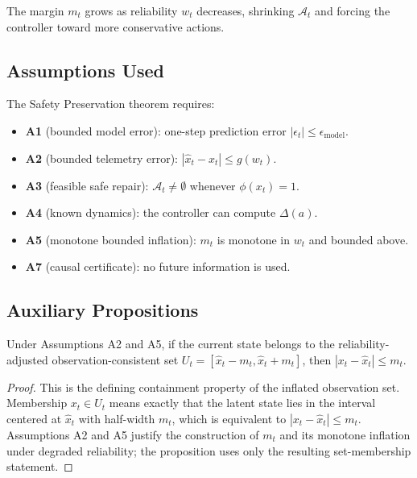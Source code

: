 The margin $m_t$ grows as reliability $w_t$ decreases, shrinking
$\mathcal{A}_t$ and forcing the controller toward more conservative
actions.

\subsection{Assumptions Used}

The Safety Preservation theorem requires:
\begin{itemize}
  \item \textbf{A1} (bounded model error): one-step prediction error
    $|\epsilon_t| \le \epsilon_{\text{model}}$.
  \item \textbf{A2} (bounded telemetry error): $|\hat{x}_t - x_t| \le g(w_t)$.
  \item \textbf{A3} (feasible safe repair): $\mathcal{A}_t \neq \emptyset$
    whenever $\phi(x_t) = 1$.
  \item \textbf{A4} (known dynamics): the controller can compute $\Delta(a)$.
  \item \textbf{A5} (monotone bounded inflation): $m_t$ is monotone in $w_t$
    and bounded above.
  \item \textbf{A7} (causal certificate): no future information is used.
\end{itemize}

\subsection{Auxiliary Propositions}

\begin{proposition}
\label{prop:margin-dominates}
Under Assumptions A2 and A5, if the current state belongs to the
reliability-adjusted observation-consistent set
$U_t = [\hat{x}_t - m_t,\hat{x}_t + m_t]$, then
$|x_t - \hat{x}_t| \le m_t$.
\end{proposition}

\begin{proof}
This is the defining containment property of the inflated observation set.
Membership $x_t \in U_t$ means exactly that the latent state lies in the
interval centered at $\hat{x}_t$ with half-width $m_t$, which is equivalent to
$|x_t-\hat{x}_t| \le m_t$.  Assumptions A2 and A5 justify the construction of
$m_t$ and its monotone inflation under degraded reliability; the proposition
uses only the resulting set-membership statement.
\end{proof}

